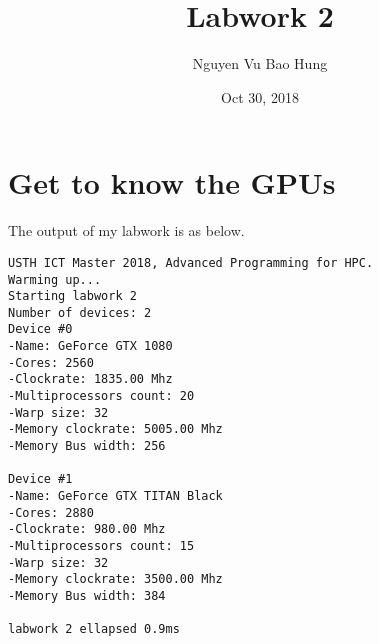 \documentclass{article}
\title{Labwork 2}
\author{Nguyen Vu Bao Hung}
\date{Oct 30, 2018}
\begin{document}
\maketitle

\section{Get to know the GPUs}
The output of my labwork is as below.
\begin{verbatim}
USTH ICT Master 2018, Advanced Programming for HPC.
Warming up...
Starting labwork 2
Number of devices: 2
Device #0
-Name: GeForce GTX 1080
-Cores: 2560
-Clockrate: 1835.00 Mhz
-Multiprocessors count: 20
-Warp size: 32 
-Memory clockrate: 5005.00 Mhz
-Memory Bus width: 256

Device #1
-Name: GeForce GTX TITAN Black
-Cores: 2880
-Clockrate: 980.00 Mhz
-Multiprocessors count: 15
-Warp size: 32 
-Memory clockrate: 3500.00 Mhz
-Memory Bus width: 384

labwork 2 ellapsed 0.9ms
\end{verbatim}
\end{document}
